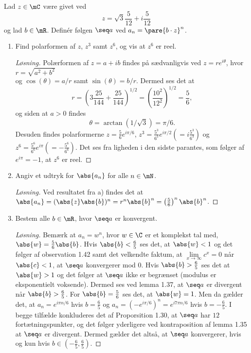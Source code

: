 \setcounter{section}{1}

\begin{opg}
Lad $z\in\mC$ være givet ved
$$ z = \sqrt{3}\frac{5}{12}+i\frac{5}{12} $$
og lad $b\in\mR$. Definér følgen $\seq a$ ved $a_n = \pare{b\cdot z}^n$.
\begin{enumerate}
    \item Find polarformen af $z$, $z^3$ samt $z^6$, og vis at $ z^6 $ er reel. 
    \ifanswers \begin{proof}[Løsning]
    	Polærformen af $ z=a+ib $ findes på sædvanligvis ved $ z=re^{i\theta} $, hvor $ r=\sqrt{a^2+b^2} $\\ og $ \cos(\theta)=a/r $ samt $ \sin(\theta)=b/r $. Dermed ses det at \begin{equation*}
    		r=\left(3\frac{25}{144}+\frac{25}{144}\right)^{1/2}=\left(\frac{10^2}{12^2}\right)^{1/2}=\frac{5}{6},
    	\end{equation*}
    	og siden at $ a>0 $ findes \begin{equation*}
    	\theta=\arctan(1/\sqrt{3})=\pi/6.
    	\end{equation*}
    	Desuden findes polarformerne $ z=\frac{5}{6}e^{i\pi/6} $, $ z^3=\frac{5^3}{6^3}e^{i\pi/2}(=i\frac{5^3}{6^3}) $ og $ z^6=\frac{5^6}{6^6}e^{i\pi}(=-\frac{5^6}{6^6}) $. Det ses fra ligheden i den sidste parantes, som følger af $ e^{i\pi}=-1 $, at $ z^6 $ er reel.
    \end{proof} \fi
    
    
    \item Angiv et udtryk for $\abs{a_n}$ for alle $n\in\mN$.
    \ifanswers \begin{proof}[Løsning]
    	Ved resultatet fra a) findes det at $ \abs{a_n}=(\abs{z}\abs{b})^n=r^n\abs{b}^n=\left(\frac{5}{6}\right)^n\abs{b}^n $.
    \end{proof} \fi

    
    
    \item Bestem alle $b\in\mR$, hvor $\seq a$ er konvergent.
    \ifanswers \begin{proof}[Løsning]
    	Bemærk at $ a_n=w^n $, hvor $ w\in\C $ er et komplekst tal med, $ \abs{w}=\frac{5}{6}\abs{b} $. Hvis $ \abs{b}<\frac{6}{5} $ ses det, at $ \abs{w}<1 $ og det følger af observation 1.42 samt det velkendte faktum, at $ \lim\limits_{x\to\infty}c^x=0 $ når $ \abs{c}<1 $, at $ \seq a $ konvergerer mod 0. Hvis $ \abs{b}>\frac{6}{5} $ ses det at $ \abs{w}>1 $ og det følger at $ \seq a $ ikke er begrænset (modulus er eksponentielt voksende). Dermed ses ved lemma 1.37, at $ \seq a $ er divergent når $ \abs{b}>\frac{6}{5} $. For $ \abs{b}=\frac{5}{6} $ ses det, at $ \abs{w}=1 $. Men da gælder det, at $ a_n=e^{i\pi n/6} $ hvis $ b=\frac{6}{5} $ og $ a_n=(-e^{i\pi/6})^n=e^{i7\pi n/6} $ hvis $ b=-\frac{6}{5} $. I begge tilfælde konkluderes det af Proporsition 1.30, at $ \seq a $ har $ 12 $ fortætningspunkter, og det følger yderligere ved kontraposition af lemma 1.35 at $ \seq a $ er divergent. Dermed gælder det altså, at $ \seq a $ konvergerer, hvis og kun hvis $ b\in\left(-\frac{6}{5},\frac{6}{5}\right) $.
    \end{proof} \fi
    

\end{enumerate}
\end{opg}
